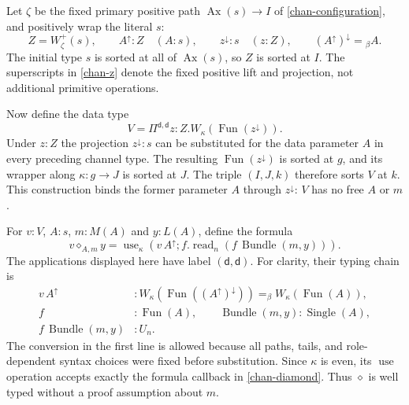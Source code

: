 Let $\zeta$ be the fixed primary positive path
$\operatorname{Ax}(s)\longrightarrow I$ of
\eqref{chan-configuration}, and positively wrap the literal $s$:
\begin{equation}
 Z=W_{\zeta}^{+}(s),\qquad
 A^\uparrow:Z\quad(A:s),\qquad
 z^\downarrow:s\quad(z:Z),\qquad
 (A^\uparrow)^\downarrow={}_\beta A.
\label{chan-z}
\end{equation}
The initial type $s$ is sorted at all of $\operatorname{Ax}(s)$, so $Z$
is sorted at $I$.  The superscripts in \eqref{chan-z} denote the fixed
positive lift and projection, not additional primitive operations.

Now define the data type
\begin{equation}
 V=\Pi^{\mathsf d,\mathsf d}z:Z.
             W_{\kappa}(\operatorname{Fun}(z^\downarrow)).
\label{chan-v}
\end{equation}
Under $z:Z$ the projection $z^\downarrow:s$ can be substituted for the
data parameter $A$ in every preceding channel type.  The resulting
$\operatorname{Fun}(z^\downarrow)$ is sorted at $g$, and its wrapper
along $\kappa:g\longrightarrow J$ is sorted at $J$.  The triple
$(I,J,k)$ therefore sorts $V$ at $k$.  This construction binds the former
parameter $A$ through $z^\downarrow$: $V$ has no free $A$ or $m$.

For $v:V$, $A:s$, $m:M(A)$ and $y:L(A)$, define the formula
\begin{equation}
 v\diamond_{A,m}y
   =\operatorname{use}_{\kappa}\left(
        v\,A^\uparrow;
        f.\operatorname{read}_n(f\,\operatorname{Bundle}(m,y))\right).
\label{chan-diamond}
\end{equation}
The applications displayed here have label $(\mathsf d,\mathsf d)$.
For clarity, their typing chain is
\[
\begin{aligned}
 v\,A^\uparrow
   &:W_{\kappa}(\operatorname{Fun}((A^\uparrow)^\downarrow))
       =_\beta W_{\kappa}(\operatorname{Fun}(A)),\\
 f&:\operatorname{Fun}(A),\qquad
 \operatorname{Bundle}(m,y):\operatorname{Single}(A),\\
 f\,\operatorname{Bundle}(m,y)&:U_n.
\end{aligned}
\]
The conversion in the first line is allowed because all paths, tails,
and role-dependent syntax choices were fixed before substitution.  Since
$\kappa$ is even, its $\operatorname{use}$ operation accepts exactly the
formula callback in \eqref{chan-diamond}.  Thus $\diamond$ is well typed
without a proof assumption about $m$.


